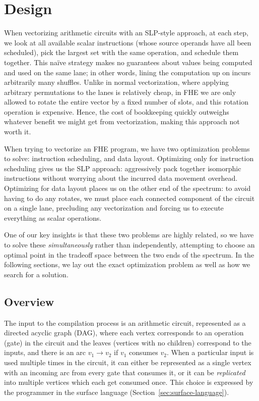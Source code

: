 \section{Design}\label{sec:design}
When vectorizing arithmetic circuits with an SLP-style approach, at each step, we look at all available scalar instructions (whose source operands have all been scheduled), pick the largest set with the same operation, and schedule them together.
This na\"ive strategy makes no guarantees about values being computed and used on the same lane; in other words, lining the computation up on incurs arbitrarily many shuffles.
Unlike in normal vectorization, where applying arbitrary permutations to the lanes is relatively cheap, in FHE we are only allowed to rotate the entire vector by a fixed number of slots, and this rotation operation is expensive.
Hence, the cost of bookkeeping quickly outweighs whatever benefit we might get from vectorization, making this approach not worth it.

When trying to vectorize 
an FHE program, we have two optimization problems to solve: instruction scheduling, and data layout.
Optimizing only for instruction scheduling gives us the SLP approach: aggressively pack together isomorphic instructions without worrying about the incurred data movement overhead.
Optimizing for data layout places us on the other end of the spectrum: to avoid having to do any rotates, we must place each connected component of the circuit on a single lane, precluding any vectorization and forcing us to execute everything as scalar operations.

One of our key insights is that these two problems are highly related, so we have to solve these {\em simultaneously} rather than independently, attempting to choose an optimal point in the tradeoff space between the two ends of the spectrum.
In the following sections, we lay out the exact optimization problem as well as how we search for a solution. 

\subsection{Overview}
The input to the compilation process is an arithmetic circuit, represented as a directed acyclic graph (DAG), where each vertex corresponds to an operation (gate) in the circuit and the leaves (vertices with no children) correspond to the inputs, and there is an arc $v_1 \to v_2$ if $v_1$ consumes $v_2$. 
When a particular input is used multiple times in the circuit, it can either be represented as a single vertex with an incoming arc from every gate that consumes it, or it can be {\em replicated} into multiple vertices which each get consumed once.
This choice is expressed by the programmer in the surface language (Section~\ref{sec:surface-language}).


